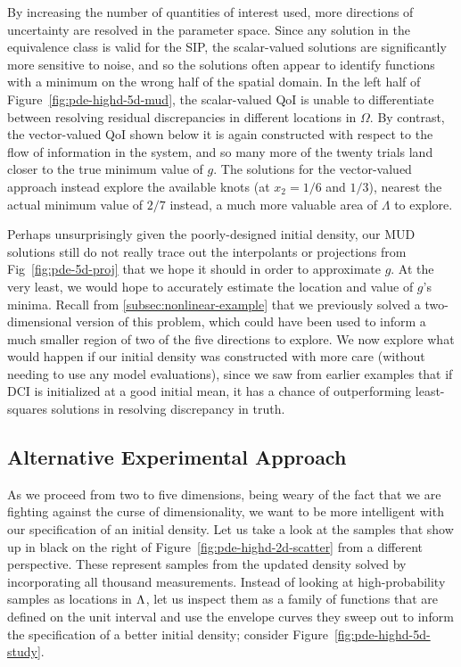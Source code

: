 By increasing the number of quantities of interest used, more directions of uncertainty are resolved in the parameter space.
Since any solution in the equivalence class is valid for the SIP, the scalar-valued solutions are significantly more sensitive to noise, and so the solutions often appear to identify functions with a minimum on the wrong half of the spatial domain.
In the left half of Figure~\ref{fig:pde-highd-5d-mud}, the scalar-valued QoI is unable to differentiate between resolving residual discrepancies in different locations in $\Omega$.
By contrast, the vector-valued QoI shown below it is again constructed with respect to the flow of information in the system, and so many more of the twenty trials land closer to the true minimum value of $g$.
The solutions for the vector-valued approach instead explore the available knots (at $x_2=1/6$ and $1/3$), nearest the actual minimum value of $2/7$ instead, a much more valuable area of $\Lambda$ to explore.

Perhaps unsurprisingly given the poorly-designed initial density, our MUD solutions still do not really trace out the interpolants or projections from Fig~\ref{fig:pde-5d-proj} that we hope it should in order to approximate $g$.
At the very least, we would hope to accurately estimate the location and value of $g$'s minima.
Recall from \ref{subsec:nonlinear-example} that we previously solved a two-dimensional version of this problem, which could have been used to inform a much smaller region of two of the five directions to explore.
We now explore what would happen if our initial density was constructed with more care (without needing to use any model evaluations), since we saw from earlier examples that if DCI is initialized at a good initial mean, it has a chance of outperforming least-squares solutions in resolving discrepancy in truth.


\subsection{Alternative Experimental Approach}

As we proceed from two to five dimensions, being weary of the fact that we are fighting against the curse of dimensionality, we want to be more intelligent with our specification of an initial density.
Let us take a look at the samples that show up in black on the right of Figure~\ref{fig:pde-highd-2d-scatter} from a different perspective.
These represent samples from the updated density solved by incorporating all thousand measurements.
Instead of looking at high-probability samples as locations in ${\Lambda}$, let us inspect them as a family of functions that are defined on the unit interval and use the envelope curves they sweep out to inform the specification of a better initial density; consider Figure~\ref{fig:pde-highd-5d-study}.


